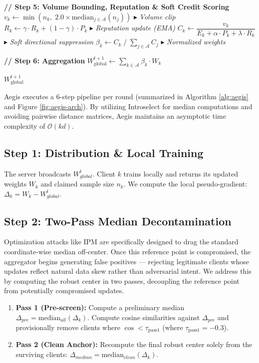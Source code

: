 \documentclass[10pt, conference]{IEEEtran}
\begin{document}
\begin{algorithm}[htbp]
\begin{algorithmic}[1]
\STATE

\STATE \textbf{// Step 5: Volume Bounding, Reputation \& Soft Credit Scoring}
    \STATE $v_k \leftarrow \min(n_k,\; 2.0 \times \text{median}_{j \in \mathcal{A}}(n_j))$ \hfill $\blacktriangleright$ \textit{Volume clip}
    \STATE $R_k \leftarrow \gamma \cdot R_k + (1 - \gamma) \cdot P_k$ \hfill $\blacktriangleright$ \textit{Reputation update (EMA)}
    \STATE $C_k \leftarrow \dfrac{v_k}{E_k + \alpha \cdot P_k + \lambda \cdot R_k}$ \hfill $\blacktriangleright$ \textit{Soft directional suppression}
\ENDFOR
\STATE $\beta_k \leftarrow C_k \;/\; \sum_{j \in \mathcal{A}} C_j$ \hfill $\blacktriangleright$ \textit{Normalized weights}

\STATE

\STATE \textbf{// Step 6: Aggregation}
\STATE $W^{t+1}_{\text{global}} \leftarrow \sum_{k \in \mathcal{A}} \beta_k \cdot W_k$

\RETURN $W^{t+1}_{\text{global}}$

\end{algorithmic}
\end{algorithm}

Aegis executes a 6-step pipeline per round (summarized in Algorithm \ref{alg:aegis} and Figure \ref{fig:aegis-arch}). By utilizing Introselect for median computations and avoiding pairwise distance matrices, Aegis maintains an asymptotic time complexity of $\mathcal{O}(kd)$.

\subsection{Step 1: Distribution \& Local Training}
The server broadcasts $W_{global}^t$. Client $k$ trains locally and returns its updated weights $W_k$ and claimed sample size $n_k$. We compute the local pseudo-gradient: $\Delta_k = W_k - W_{global}^t$.

\subsection{Step 2: Two-Pass Median Decontamination}
Optimization attacks like IPM are specifically designed to drag the standard coordinate-wise median off-center. Once this reference point is compromised, the aggregator begins generating false positives — rejecting legitimate clients whose updates reflect natural data skew rather than adversarial intent. We address this by computing the robust center in two passes, decoupling the reference point from potentially compromised updates.
\begin{enumerate}
    \item \textbf{Pass 1 (Pre-screen):} Compute a preliminary median $\Delta_{pre} = \text{median}_{all}(\Delta_k)$. Compute cosine similarities against $\Delta_{pre}$ and provisionally remove clients where $\cos < \tau_{\text{pass1}}$ (where $\tau_{\text{pass1}} = -0.3$).
    \item \textbf{Pass 2 (Clean Anchor):} Recompute the final robust center solely from the surviving clients: $\Delta_{median} = \text{median}_{clean}(\Delta_k)$.
\end{enumerate}
\end{document}
